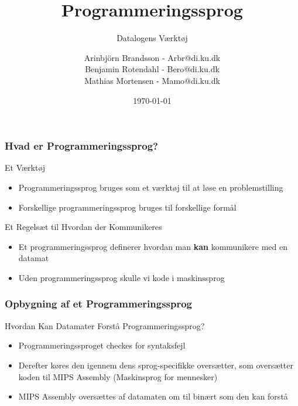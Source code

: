 \documentclass[12pt,t]{beamer}
\title{Programmeringssprog}
\subtitle{Datalogens Værktøj}
\author{
        Arinbjörn Brandsson - Arbr@di.ku.dk \\
        Benjamin Rotendahl - Bero@di.ku.dk\\
        Mathias Mortensen - Mamo@di.ku.dk
}
\date[]{\today}
\begin{document}
\frame{\titlepage}

\begin{frame}
\frametitle{Hvad er Programmeringssprog?}
\begin{block}{Et Værktøj}
\begin{itemize}
\item Programmeringssprog bruges som et værktøj til at løse en problemstilling\\
\item Forskellige programmeringssprog bruges til forskellige formål
\end{itemize}
\end{block}
\begin{block}{Et Regelsæt til Hvordan der Kommunikeres}
\begin{itemize}
\item Et programmeringssprog definerer hvordan man \textbf{kan} kommunikere med
en datamat\\
\item Uden programmeringssprog skulle vi kode i maskinssprog
\end{itemize}
\end{block}
\end{frame}

\begin{frame}
\frametitle{Opbygning af et Programmeringssprog}
\begin{block}{Hvordan Kan Datamater Forstå Programmeringssprog?}
\begin{itemize}
\item Programmeringssproget checkes for syntaksfejl\\
\item Derefter køres den igennem dens sprog-specifikke oversætter,
som oversætter koden til MIPS Assembly (Maskinsprog for mennesker)\\
\item MIPS Assembly oversættes af datamaten om til binært som den kan forstå
\end{itemize}
\end{block}
\end{frame}
\end{document}

